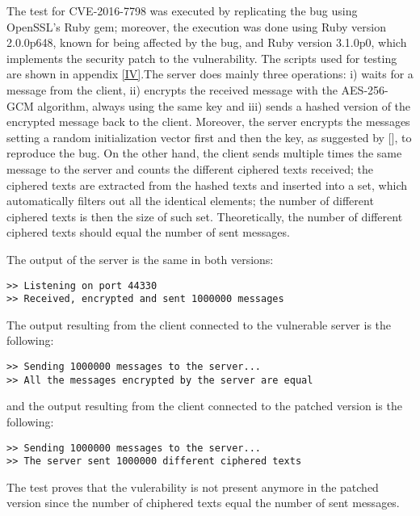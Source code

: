 The test for CVE-2016-7798 was executed by replicating the bug using OpenSSL's Ruby gem; moreover, the execution was done using Ruby version 2.0.0p648, known for being affected by the bug, and Ruby version 3.1.0p0, which implements the security patch to the vulnerability. The scripts used for testing are shown in appendix \ref{IV}.The server does mainly three operations: i) waits for a message from the client, ii) encrypts the received message with the AES-256-GCM algorithm, always using the same key and iii) sends a hashed version of the encrypted message back to the client. Moreover, the server encrypts the messages setting a random initialization vector first and then the key, as suggested by [], to reproduce the bug. On the other hand, the client sends multiple times the same message to the server and counts the different ciphered texts received; the ciphered texts are extracted from the hashed texts and inserted into a set, which automatically filters out all the identical elements; the number of different ciphered texts is then the size of such set. Theoretically, the number of different ciphered texts should equal the number of sent messages.

The output of the server is the same in both versions:
\begin{verbatim}
>> Listening on port 44330
>> Received, encrypted and sent 1000000 messages
\end{verbatim}

The output resulting from the client connected to the vulnerable server is the following:
\begin{verbatim}
>> Sending 1000000 messages to the server...
>> All the messages encrypted by the server are equal
\end{verbatim}

and the output resulting from the client connected to the patched version is the following:
\begin{verbatim}
>> Sending 1000000 messages to the server...
>> The server sent 1000000 different ciphered texts
\end{verbatim}

The test proves that the vulerability is not present anymore in the patched version since the number of chiphered texts equal the number of sent messages.


